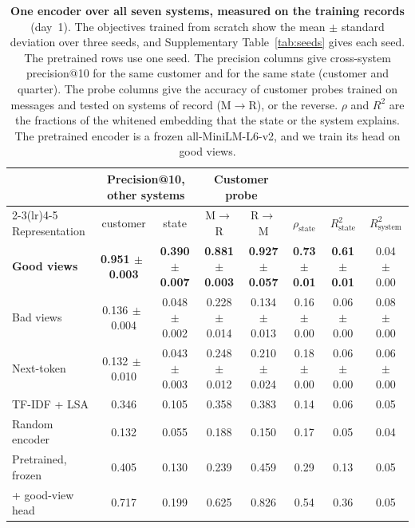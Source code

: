 \documentclass[11pt]{article}
\begin{document}
\begin{table}[h]
\centering
\small
\caption{\textbf{One encoder over all seven systems, measured on the training records} (day~1). The objectives trained from scratch show the mean $\pm$ standard deviation over three seeds, and Supplementary Table~\ref{tab:seeds} gives each seed. The pretrained rows use one seed. The precision columns give cross-system precision@10 for the same customer and for the same state (customer and quarter). The probe columns give the accuracy of customer probes trained on messages and tested on systems of record (M$\to$R), or the reverse. $\rho$ and $R^2$ are the fractions of the whitened embedding that the state or the system explains. The pretrained encoder is a frozen all-MiniLM-L6-v2, and we train its head on good views.}
\label{tab:e1}
\setlength{\tabcolsep}{3.6pt}
\begin{tabular}{lccccccc}
\toprule
& \multicolumn{2}{c}{Precision@10, other systems} & \multicolumn{2}{c}{Customer probe} & & & \\
\cmidrule(lr){2-3}\cmidrule(lr){4-5}
Representation & customer & state & M$\to$R & R$\to$M & $\rho_{\text{state}}$ & $R^2_{\text{state}}$ & $R^2_{\text{system}}$ \\
\midrule
\textcolor{goodblue}{\textbf{Good views}} & \textbf{0.951{\scriptsize$\,\pm\,$0.003}} & \textbf{0.390{\scriptsize$\,\pm\,$0.007}} & \textbf{0.881{\scriptsize$\,\pm\,$0.003}} & \textbf{0.927{\scriptsize$\,\pm\,$0.057}} & \textbf{0.73{\scriptsize$\,\pm\,$0.01}} & \textbf{0.61{\scriptsize$\,\pm\,$0.01}} & 0.04{\scriptsize$\,\pm\,$0.00} \\
\textcolor{badorange}{Bad views} & 0.136{\scriptsize$\,\pm\,$0.004} & 0.048{\scriptsize$\,\pm\,$0.002} & 0.228{\scriptsize$\,\pm\,$0.014} & 0.134{\scriptsize$\,\pm\,$0.013} & 0.16{\scriptsize$\,\pm\,$0.00} & 0.06{\scriptsize$\,\pm\,$0.00} & 0.08{\scriptsize$\,\pm\,$0.00} \\
\textcolor{ntpaqua}{Next-token} & 0.132{\scriptsize$\,\pm\,$0.010} & 0.043{\scriptsize$\,\pm\,$0.003} & 0.248{\scriptsize$\,\pm\,$0.012} & 0.210{\scriptsize$\,\pm\,$0.024} & 0.18{\scriptsize$\,\pm\,$0.00} & 0.06{\scriptsize$\,\pm\,$0.00} & 0.06{\scriptsize$\,\pm\,$0.00} \\
TF-IDF + LSA & 0.346 & 0.105 & 0.358 & 0.383 & 0.14 & 0.06 & 0.05 \\
Random encoder & 0.132 & 0.055 & 0.188 & 0.150 & 0.17 & 0.05 & 0.04 \\
\addlinespace[2pt]
Pretrained, frozen & 0.405 & 0.130 & 0.239 & 0.459 & 0.29 & 0.13 & 0.05 \\
\quad + \textcolor{goodblue}{good-view} head & 0.717 & 0.199 & 0.625 & 0.826 & 0.54 & 0.36 & 0.05 \\
\bottomrule
\end{tabular}
\end{table}
\end{document}
